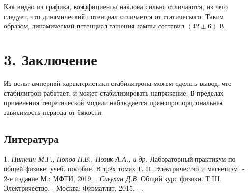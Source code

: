 \documentclass[14pt,a4paper]{article}
\newcommand{\n}{\hfill \break}
\begin{document}
Как видно из графика, коэффициенты наклона сильно отличаются, из чего следует, что динамический потенциал отличается от статического. Таким образом, динамический потенциал гашения лампы составил $(42 \pm 6)$ В.

\section*{3. Заключение}

Из вольт-амперной характеристики стабилитрона можем сделать вывод, что стабилитрон работает, и может стабилизировать напряжение. В пределах применения теоретической модели наблюдается прямопропорциональная зависимость периода от ёмкости. 

\subsection*{Литература}

1. \textit{Никулин М.Г., Попов П.В., Нозик А.А., и др.} Лабораторный практикум по общей физике: учеб. пособие. В трёх томах  Т. II. Электричество и магнетизм. - 2-е издание М.: МФТИ, 2019. \n
2. \textit{Сивухин Д.В.} Общий курс физики. Т.III. Электричество. - Москва: Физматлит, 2015. - .\n\n
\end{document}

